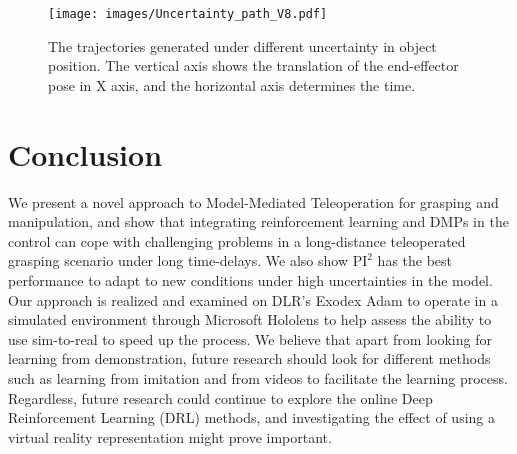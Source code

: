 \documentclass[letterpaper, 10 pt, conference]{ieeeconf}  %
\begin{document}
\begin{figure}[t!]
    \centering
    \texttt{[image: images/Uncertainty\_path\_V8.pdf]}
    \caption[The trajectories generated under different uncertainty in object position.]{The trajectories generated under different uncertainty in object position. The vertical axis shows the translation of the end-effector pose in X axis, and the horizontal axis determines the time. }
    \label{fig:Uncertainty_Path}
    \vspace{-5mm}
\end{figure}
\section{Conclusion}
\label{section:conclusion}
We present a novel approach to Model-Mediated Teleoperation for grasping and manipulation, and show that integrating reinforcement learning and DMPs in the control can cope with challenging problems in a long-distance teleoperated grasping scenario under long time-delays. We also show $\textrm{PI}^2$ has the best performance to adapt to new conditions under high uncertainties in the model. Our approach is realized and examined on DLR's Exodex Adam to operate in a simulated environment through Microsoft Hololens to help assess the ability to use sim-to-real to speed up the process. 
We believe that apart from looking for learning from demonstration, future research should look for different methods such as learning from imitation and from videos to facilitate the learning process.
Regardless, future research could continue to explore the online Deep Reinforcement Learning (DRL) methods, and investigating the effect of using a virtual reality representation might prove important.
    
\end{document}
